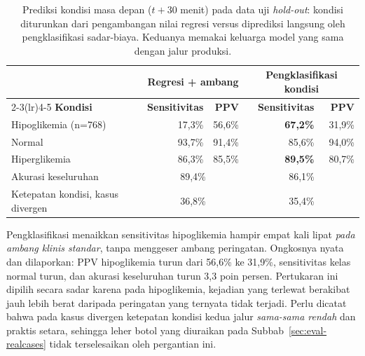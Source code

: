 \begin{table}[htbp]
\centering
\caption{Prediksi kondisi masa depan ($t+30$ menit) pada data uji \emph{hold-out}: kondisi diturunkan dari pengambangan nilai regresi versus diprediksi langsung oleh pengklasifikasi sadar-biaya. Keduanya memakai keluarga model yang sama dengan jalur produksi.}
\label{tab:classifier}
\small
\begin{tabular}{@{}lrrrr@{}}
\toprule
& \multicolumn{2}{c}{\textbf{Regresi + ambang}} & \multicolumn{2}{c}{\textbf{Pengklasifikasi kondisi}} \\
\cmidrule(lr){2-3}\cmidrule(lr){4-5}
\textbf{Kondisi} & \textbf{Sensitivitas} & \textbf{PPV} & \textbf{Sensitivitas} & \textbf{PPV} \\
\midrule
Hipoglikemia (n=768) & 17,3\% & 56,6\% & \textbf{67,2\%} & 31,9\% \\
Normal & 93,7\% & 91,4\% & 85,6\% & 94,0\% \\
Hiperglikemia & 86,3\% & 85,5\% & \textbf{89,5\%} & 80,7\% \\
\midrule
Akurasi keseluruhan & \multicolumn{2}{c}{89,4\%} & \multicolumn{2}{c}{86,1\%} \\
Ketepatan kondisi, kasus divergen & \multicolumn{2}{c}{36,8\%} & \multicolumn{2}{c}{35,4\%} \\
\bottomrule
\end{tabular}

\vspace{0.4em}
{\tabnotestyle Pengklasifikasi menaikkan sensitivitas hipoglikemia hampir empat kali lipat \emph{pada ambang klinis standar}, tanpa menggeser ambang peringatan. Ongkosnya nyata dan dilaporkan: PPV hipoglikemia turun dari 56,6\% ke 31,9\%, sensitivitas kelas normal turun, dan akurasi keseluruhan turun 3,3 poin persen. Pertukaran ini dipilih secara sadar karena pada hipoglikemia, kejadian yang terlewat berakibat jauh lebih berat daripada peringatan yang ternyata tidak terjadi. Perlu dicatat bahwa pada kasus divergen ketepatan kondisi kedua jalur \emph{sama-sama rendah} dan praktis setara, sehingga leher botol yang diuraikan pada Subbab~\ref{sec:eval-realcases} tidak terselesaikan oleh pergantian ini.\par}
\end{table}
